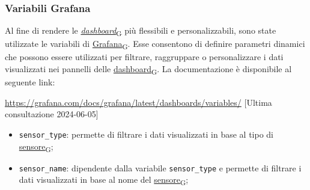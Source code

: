 \subsubsection{Variabili Grafana}
Al fine di rendere le \href{https://7last.github.io/docs/pb/documentazione-interna/glossario\#dashboard}{\textit{dashboard}\textsubscript{G}} più flessibili e personalizzabili, sono state utilizzate le variabili di \href{https://7last.github.io/docs/pb/documentazione-interna/glossario\#grafana}{Grafana\textsubscript{G}}. Esse consentono di definire parametri dinamici che possono essere utilizzati per filtrare, raggruppare o personalizzare i dati visualizzati nei pannelli delle \href{https://7last.github.io/docs/pb/documentazione-interna/glossario\#dashboard}{dashboard\textsubscript{G}}.
La documentazione è disponibile al seguente link:
\begin{center}
	\url{https://grafana.com/docs/grafana/latest/dashboards/variables/} [Ultima consultazione 2024-06-05]
\end{center}
\begin{itemize}
	\item \texttt{sensor\_type}: permette di filtrare i dati visualizzati in base al tipo di \href{https://7last.github.io/docs/pb/documentazione-interna/glossario\#sensore}{sensore\textsubscript{G}};
	\item \texttt{sensor\_name}: dipendente dalla variabile \texttt{sensor\_type} e permette di filtrare i dati visualizzati in base al nome del \href{https://7last.github.io/docs/pb/documentazione-interna/glossario\#sensore}{sensore\textsubscript{G}};
\end{itemize}

